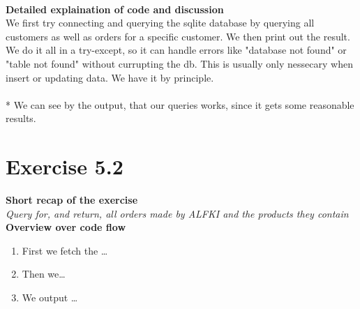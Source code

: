 \documentclass{article}
\begin{document}
~\\
\textbf{Detailed explaination of code and discussion}\\
We first try connecting and querying the sqlite database by querying all customers as well as orders for a specific customer. We then print out the result. 
We do it all in a try-except, so it can handle errors like "database not found" or "table not found" without  currupting the db. This is usually only nessecary when insert or updating data. We have it by principle. \\
\\*
We can see by the output, that our queries works, since it gets some reasonable results. 


\section{Exercise 5.2}
\textbf{Short recap of the exercise}\\
\textit{Query for, and return, all orders made by ALFKI and the products they contain}\\

\textbf{Overview over code flow}\\

\begin{enumerate}
  \item First we fetch the \ldots
  \item Then we\ldots
  \item We output \ldots\\
\end{enumerate}
\end{document}
